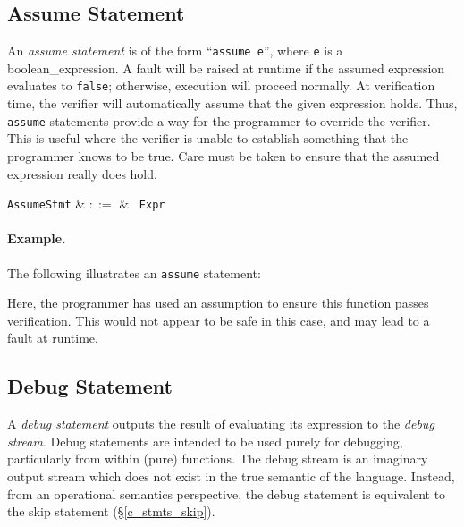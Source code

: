 \subsection{Assume Statement}

An {\em assume statement} is of the form ``\lstinline{assume e}'', where \lstinline{e} is a \gls{boolean_expression}.  A \gls{fault} will be raised at runtime if the assumed expression evaluates to \lstinline{false}; otherwise, execution will proceed normally.  At verification time, the verifier will automatically assume that the given expression holds.  Thus, \lstinline{assume} statements provide a way for the programmer to override the verifier.  This is useful where the verifier is unable to establish something that the programmer knows to be true.  Care must be taken to ensure that the assumed expression really does hold.

\begin{syntax}
  \verb+AssumeStmt+ & $::=$ & \ \verb+Expr+\\
\end{syntax}

\paragraph{Example.} The following illustrates an \lstinline{assume} statement:



Here, the programmer has used an assumption to ensure this function passes verification.  This would not appear to be safe in this case, and may lead to a fault at runtime.



\subsection{Debug Statement}
A {\em debug statement} outputs the result of evaluating its expression to the {\em debug stream}.  Debug statements are intended to be used purely for debugging, particularly from within (pure) functions.  The debug stream is an imaginary output stream which does not exist in the true semantic of the language.  Instead, from an operational semantics perspective, the debug statement is equivalent to the skip statement (\S\ref{c_stmts_skip}).


